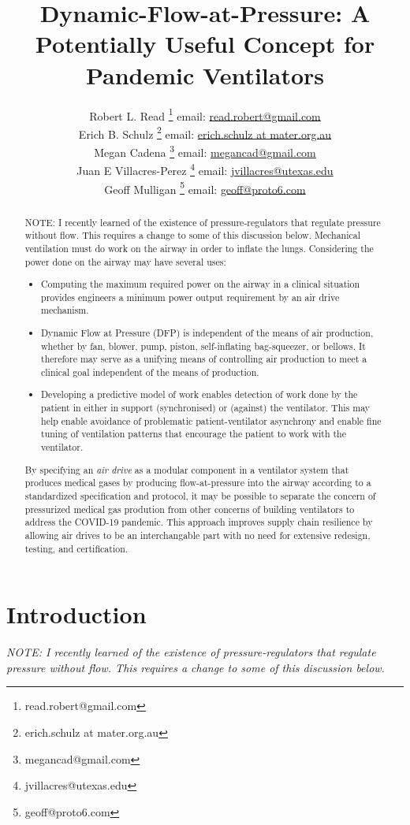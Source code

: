 \documentclass[conference]{article}
\title{Dynamic-Flow-at-Pressure: A Potentially Useful Concept for Pandemic Ventilators}
\author{Robert L. Read
  \thanks{read.robert@gmail.com}
  email: \href{mailto:read.robert@gmail.com}{read.robert@gmail.com}\\
  Erich B. Schulz
  \thanks{ erich.schulz at mater.org.au}
  email: \href{mailto:erich.schulz at mater.org.au}{erich.schulz at mater.org.au}\\
Megan Cadena
  \thanks{megancad@gmail.com}
  email: \href{mailto:megancad@gmail.com}{megancad@gmail.com}\\
  Juan E Villacres-Perez
  \thanks{jvillacres@utexas.edu}
  email: \href{mailto:jvillacres@utexas.edu}{jvillacres@utexas.edu}\\
  Geoff Mulligan
  \thanks{geoff@proto6.com }
  email: \href{mailto:geoff@proto6.com}{geoff@proto6.com }
  }
\begin{document}
\maketitle
\begin{abstract}
  NOTE: I recently learned of the existence of pressure-regulators that regulate pressure without flow. This requires a change to some of this discussion below.
  Mechanical ventilation must do work on the airway in order to inflate the lungs.
  Considering the power done on the airway may have several uses:
  \begin{itemize}
  \item Computing the maximum required power on the airway in
    a clinical situation provides engineers a minimum power output requirement
    by an air drive mechanism.
  \item Dynamic Flow at Pressure (DFP) is independent of the means of air production,
    whether by fan, blower, pump, piston, self-inflating bag-squeezer, or bellows.
    It therefore
    may serve as a unifying means of controlling air production to meet
    a clinical goal independent of the means of production.
    \item Developing a predictive model of work enables detection of work done by the patient in either in support (synchronised) or (against) the ventilator.  This may help enable avoidance of problematic patient-ventilator asynchrony and enable fine tuning of ventilation patterns that encourage the patient to work with the ventilator.
  \end{itemize}
  By specifying an {\em air drive} as a modular component in a ventilator
  system that produces medical gases by producing flow-at-pressure into the airway according to a
  standardized specification and protocol, it may be possible to
  separate the concern of pressurized medical gas
  prodution from other concerns of building
  ventilators to address the COVID-19 pandemic. This approach improves
  supply chain resilience by allowing air drives to be an interchangable part with
  no need for extensive redesign, testing, and certification.
\end{abstract}


\section{Introduction}

{\em
NOTE: I recently learned of the existence of pressure-regulators that regulate pressure without flow. This requires a change to some of this discussion below.
}
\end{document}
